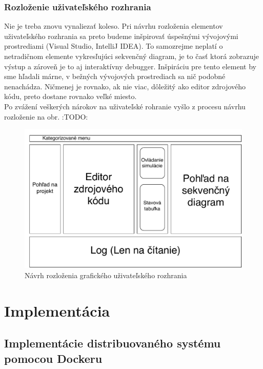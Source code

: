 \subsection{Rozloženie uživateľského rozhrania}

Nie je treba znovu vynaliezať koleso. Pri návrhu rozloženia elementov uživateľského rozhrania sa preto budeme inšpirovať úspešnými vývojovými prostrediami (Visual Studio, IntelliJ IDEA).
To samozrejme neplatí o netradičnom elemente vykresľujúci sekvenčný diagram, je to časť ktorá zobrazuje výstup a zároveň je to aj interaktívny debugger. Inšpiráciu pre tento element by sme hľadali márne, v bežných vývojových prostrediach sa nič podobné nenachádza.
Ničmenej je rovnako, ak nie viac, dôležitý ako editor zdrojového kódu, preto dostane rovnako veľké miesto. \\

Po zvážení veškerých nárokov na uživateľské rohranie vyšlo z procesu návrhu rozloženie na obr. :TODO:

\begin{figure}[H]
	\label{fig:ui-layout}
	\centering
	\includegraphics[scale=0.75]{obrazky-figures/UI-layout}
	\caption{Návrh rozloženia grafického uživateľského rozhrania}
\end{figure}



\chapter{Implementácia}

\section{Implementácie distribuovaného systému pomocou Dockeru}

